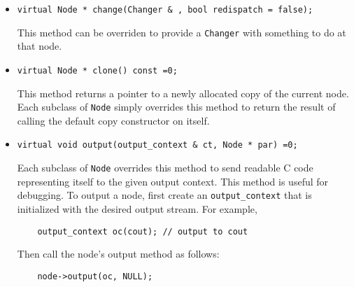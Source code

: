 \documentclass[10pt]{article}
\begin{document}
\begin{itemize}
\item
\begin{small}
\begin{verbatim}
virtual Node * change(Changer & , bool redispatch = false);
\end{verbatim}
\end{small}

This method can be overriden to provide a {\tt Changer} with something to do
at that node.

\item
\begin{small}
\begin{verbatim}
virtual Node * clone() const =0;
\end{verbatim}
\end{small}

This method returns a pointer to a newly allocated copy of the current node.
Each subclass of {\tt Node} simply overrides this method to return the result
of calling the default copy constructor on itself.

\item
\begin{small}
\begin{verbatim}
virtual void output(output_context & ct, Node * par) =0;
\end{verbatim}
\end{small}

Each subclass of {\tt Node} overrides this method to send readable C code
representing itself to the given output context.  This method is useful for
debugging.  To output a node, first create an {\tt output\_context} that is 
initialized with the desired output stream.  For example,

\begin{small}
\begin{verbatim}
    output_context oc(cout); // output to cout
\end{verbatim}
\end{small}

\noindent
Then call the node's output method as follows:

\begin{small}
\begin{verbatim}
    node->output(oc, NULL);
\end{verbatim}
\end{small}


\end{itemize}
\end{document}
